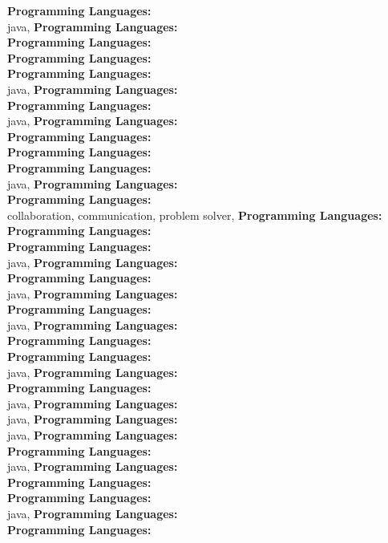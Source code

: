 \textbf{Programming Languages:} \\
java, \textbf{Programming Languages:} \\
\textbf{Programming Languages:} \\
\textbf{Programming Languages:} \\
\textbf{Programming Languages:} \\
java, \textbf{Programming Languages:} \\
\textbf{Programming Languages:} \\
java, \textbf{Programming Languages:} \\
\textbf{Programming Languages:} \\
\textbf{Programming Languages:} \\
\textbf{Programming Languages:} \\
java, \textbf{Programming Languages:} \\
\textbf{Programming Languages:} \\
collaboration, communication, problem solver, \textbf{Programming Languages:} \\
\textbf{Programming Languages:} \\
\textbf{Programming Languages:} \\
java, \textbf{Programming Languages:} \\
\textbf{Programming Languages:} \\
java, \textbf{Programming Languages:} \\
\textbf{Programming Languages:} \\
java, \textbf{Programming Languages:} \\
\textbf{Programming Languages:} \\
\textbf{Programming Languages:} \\
java, \textbf{Programming Languages:} \\
\textbf{Programming Languages:} \\
java, \textbf{Programming Languages:} \\
java, \textbf{Programming Languages:} \\
java, \textbf{Programming Languages:} \\
\textbf{Programming Languages:} \\
java, \textbf{Programming Languages:} \\
\textbf{Programming Languages:} \\
\textbf{Programming Languages:} \\
java, \textbf{Programming Languages:} \\
\textbf{Programming Languages:} \\
